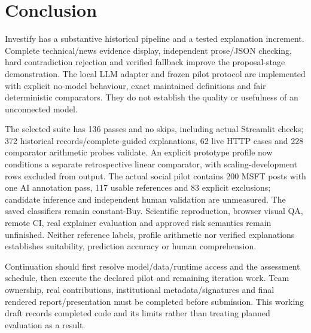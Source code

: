 \chapter{Conclusion}
Investify has a substantive historical pipeline and a tested explanation increment. Complete technical/news evidence display, independent prose/JSON checking, hard contradiction rejection and verified fallback improve the proposal-stage demonstration. The local LLM adapter and frozen pilot protocol are implemented with explicit no-model behaviour, exact maintained definitions and fair deterministic comparators. They do not establish the quality or usefulness of an unconnected model.

The selected suite has 136 passes and no skips, including actual Streamlit checks; 372 historical records/complete-guided explanations, 62 live HTTP cases and 228 comparator arithmetic probes validate. An explicit prototype profile now conditions a separate retrospective linear comparator, with scaling-development rows excluded from output. The actual social pilot contains 200 MSFT posts with one AI annotation pass, 117 usable references and 83 explicit exclusions; candidate inference and independent human validation are unmeasured. The saved classifiers remain constant-Buy. Scientific reproduction, browser visual QA, remote CI, real explainer evaluation and approved risk semantics remain unfinished. Neither reference labels, profile arithmetic nor verified explanations establishes suitability, prediction accuracy or human comprehension.

Continuation should first resolve model/data/runtime access and the assessment schedule, then execute the declared pilot and remaining iteration work. Team ownership, real contributions, institutional metadata/signatures and final rendered report/presentation must be completed before submission. This working draft records completed code and its limits rather than treating planned evaluation as a result.
